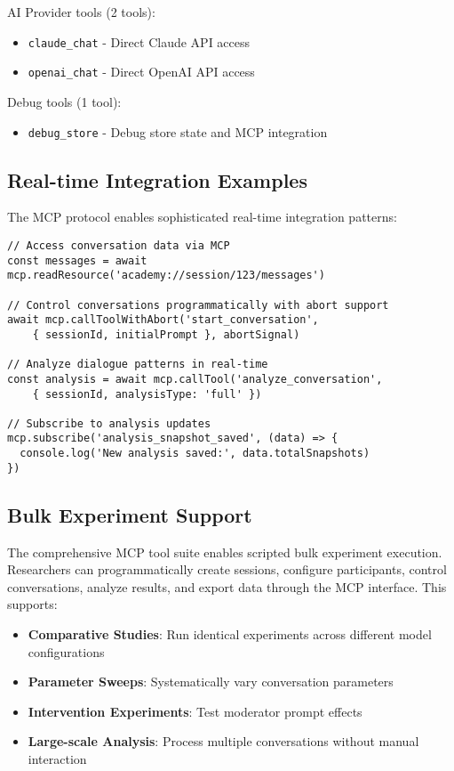 \documentclass[11pt,letterpaper]{article}
\begin{document}
AI Provider tools (2 tools):
\begin{itemize}
    \item \texttt{claude\_chat} - Direct Claude API access
    \item \texttt{openai\_chat} - Direct OpenAI API access
\end{itemize}

Debug tools (1 tool):
\begin{itemize}
    \item \texttt{debug\_store} - Debug store state and MCP integration
\end{itemize}

\subsection{Real-time Integration Examples}

The MCP protocol enables sophisticated real-time integration patterns:

\begin{verbatim}
// Access conversation data via MCP
const messages = await mcp.readResource('academy://session/123/messages')

// Control conversations programmatically with abort support
await mcp.callToolWithAbort('start_conversation', 
    { sessionId, initialPrompt }, abortSignal)

// Analyze dialogue patterns in real-time
const analysis = await mcp.callTool('analyze_conversation', 
    { sessionId, analysisType: 'full' })

// Subscribe to analysis updates
mcp.subscribe('analysis_snapshot_saved', (data) => {
  console.log('New analysis saved:', data.totalSnapshots)
})
\end{verbatim}

\subsection{Bulk Experiment Support}

The comprehensive MCP tool suite enables scripted bulk experiment execution. Researchers can programmatically create sessions, configure participants, control conversations, analyze results, and export data through the MCP interface. This supports:

\begin{itemize}
    \item \textbf{Comparative Studies}: Run identical experiments across different model configurations
    \item \textbf{Parameter Sweeps}: Systematically vary conversation parameters
    \item \textbf{Intervention Experiments}: Test moderator prompt effects
    \item \textbf{Large-scale Analysis}: Process multiple conversations without manual interaction
\end{itemize}
\end{document}
